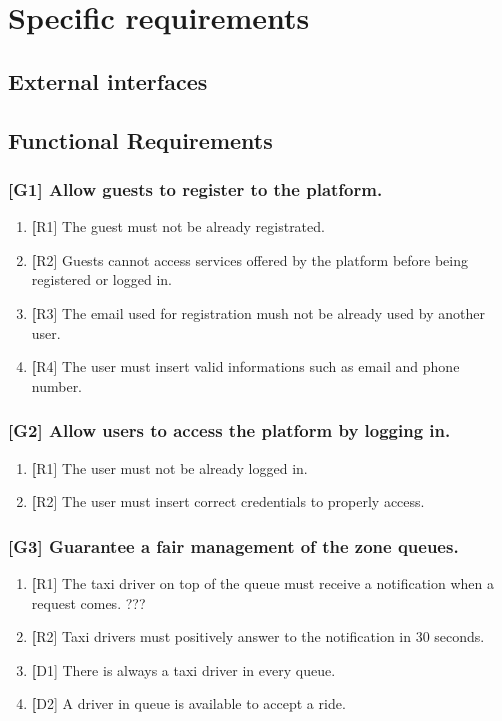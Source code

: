 \section{Specific requirements}

\subsection{External interfaces}


\subsection{Functional Requirements}
\subsubsection{[G1] Allow guests to register to the platform.}
	\begin{enumerate}
	\item \textbf [R1] The guest must not be already registrated.
	\item \textbf [R2] Guests cannot access services offered by the platform before being registered or logged in.
	\item \textbf [R3] The email used for registration mush not be already used by another user.
	\item \textbf [R4] The user must insert valid informations such as email and phone number.
	\end{enumerate}

\subsubsection{[G2] Allow users to access the platform by logging in.}
	\begin{enumerate}
	\item \textbf [R1] The user must not be already logged in.
	\item \textbf [R2] The user must insert correct credentials to properly access.
	\end{enumerate}
	
\subsubsection{[G3] Guarantee a fair management of the zone queues.}
	\begin{enumerate}
	\item \textbf [R1] The taxi driver on top of the queue must receive a notification when a request comes. ???
	\item \textbf [R2] Taxi drivers must positively answer to the notification in 30 seconds.
	\item \textbf [D1] There is always a taxi driver in every queue.
	\item \textbf [D2] A driver in queue is available to accept a ride.
	\end{enumerate}
